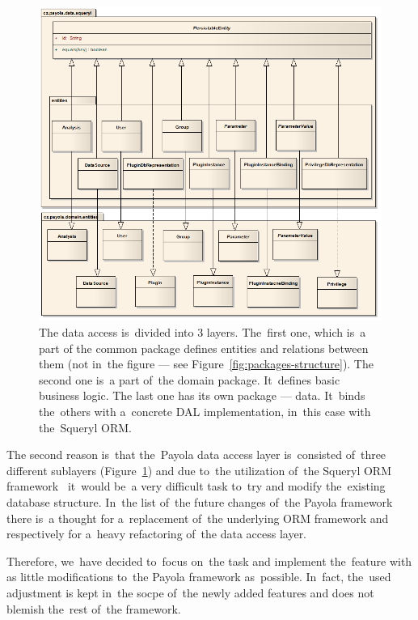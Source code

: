 \begin{figure}
	\centering
	\includegraphics[width=140mm]{img/data_entities.png}
	\caption{The data access is~divided into 3 layers. The~first one, which is~a part of
	the common package defines entities and relations between them (not in~the figure ---
	see Figure~\ref{fig:packages-structure}).
	The second one is~a part of~the domain package. It~defines basic business logic.
	The last one has its own package --- data. It~binds the~others with a~concrete DAL
	implementation, in~this case with the~Squeryl ORM. ~\cite{payola:dg}}
	\label{fig:3-layers}
\end{figure}

The second reason is~that the~Payola data access layer is~consisted of~three different sublayers
(Figure~\ref{fig:3-layers}) and 
due to~the utilization of~the Squeryl ORM framework~\cite{squeryl} it~would be~a very difficult 
task to~try and modify the~existing database structure. In~the list of~the future changes of~the Payola framework there is~a thought for a~replacement of~the underlying ORM framework
and respectively for a~heavy refactoring of~the data access layer.

Therefore, we~have decided to~focus on~the task and implement the~feature with 
as little modifications to~the Payola framework as~possible. In~fact, the~used adjustment is
kept in~the socpe of~the newly added features and does not blemish the~rest of~the framework.

